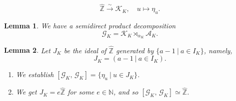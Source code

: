 \documentclass[10pt,a4paper]{amsart}
\newtheorem{lemma}{Lemma}
\begin{document}
\begin{equation}\label{ZKue}
\widehat{\mathbb{Z}}\stackrel{\sim}{\rightarrow}\mathcal{K}_K,
\quad u\mapsto\eta_u.
\end{equation}

\begin{lemma}\label{decomposition}
We have a semidirect product decomposition
\begin{equation*}
\mathcal{G}_K=\mathcal{K}_K\rtimes_{\alpha_K}\mathcal{A}_K.
\end{equation*}
\end{lemma}

\begin{lemma}\label{comm}
Let $J_K$ be the ideal of $\widehat{\mathbb{Z}}$ generated by 
$\{a-1~|~a\in I_K\}$, namely,
\begin{equation*}
J_K=(a-1~|~a\in I_K).
\end{equation*}
\begin{enumerate}
\item[\textup{(i)}] We establish $[\mathcal{G}_K,\,\mathcal{G}_K]=\{\eta_u~|~u\in J_K\}$.
\item[\textup{(ii)}] We get
$J_K=e\widehat{\mathbb Z}$ for some $e\in\mathbb{N}$,
and so $[\mathcal{G}_K,\,\mathcal{G}_K]\simeq\widehat{\mathbb{Z}}$.
\end{enumerate}
\end{lemma}
\end{document}

